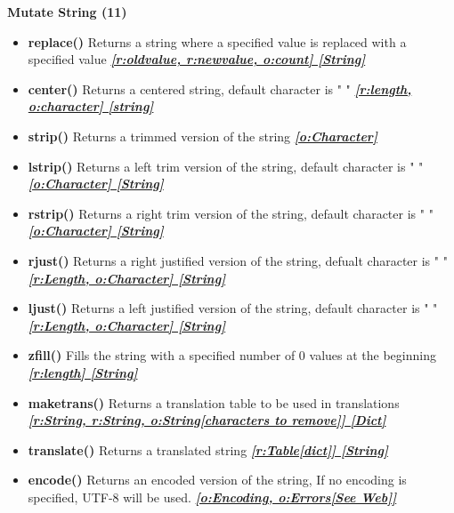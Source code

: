 \documentclass{report}
\begin{document}
      \begin{center}
        \textbf{Mutate String (11)}
      \end{center}
      \begin{itemize}
        \item[\ding{43}] \textbf{replace()} Returns a string where a specified value is replaced with a specified value
          \smallbreak
          \textbf{\textit{\underline{[r:oldvalue, r:newvalue, o:count] [String]}}}
          \smallbreak
        \item[\ding{43}] \textbf{center()} Returns a centered string, default character is " "
          \smallbreak
          \textbf{\textit{\underline{[r:length, o:character] [string]}}}
          \smallbreak
        \item[\ding{43}] \textbf{strip()}	Returns a trimmed version of the string 
          \smallbreak
          \textbf{\textit{\underline{[o:Character]}}}
        \item[\ding{43}] \textbf{lstrip()} Returns a left trim version of the string, default character is " "
          \smallbreak
          \textbf{\textit{\underline{[o:Character] [String]}}}
          \smallbreak
        \item[\ding{43}] \textbf{rstrip()} Returns a right trim version of the string, default character is " "
          \smallbreak
          \textbf{\textit{\underline{[o:Character] [String]}}}
          \smallbreak
        \item[\ding{43}] \textbf{rjust()}	Returns a right justified version of the string, defualt character is " "
          \smallbreak
          \textbf{\textit{\underline{[r:Length, o:Character] [String]}}}
          \smallbreak
        \item[\ding{43}] \textbf{ljust()}	Returns a left justified version of the string, default character is " "
          \smallbreak
          \textbf{\textit{\underline{[r:Length, o:Character] [String]}}}
          \smallbreak
        \item[\ding{43}] \textbf{zfill()}	Fills the string with a specified number of 0 values at the beginning
          \smallbreak
          \textbf{\textit{\underline{[r:length] [String]}}}
          \smallbreak
        \item[\ding{43}] \textbf{maketrans()}    Returns a translation table to be used in translations
          \smallbreak
          \textbf{\textit{\underline{[r:String, r:String, o:String[characters to remove]] [Dict]}}}
          \smallbreak
        \item[\ding{43}] \textbf{translate()}    Returns a translated string
          \smallbreak
          \textbf{\textit{\underline{[r:Table[dict]] [String]}}}
          \smallbreak
        \item[\ding{43}] \textbf{encode()}    Returns an encoded version of the string, If no encoding is specified, UTF-8 will be used.
          \smallbreak
          \textbf{\textit{\underline{[o:Encoding, o:Errors[See Web]]}}}
      \end{itemize}
    
\end{document}
